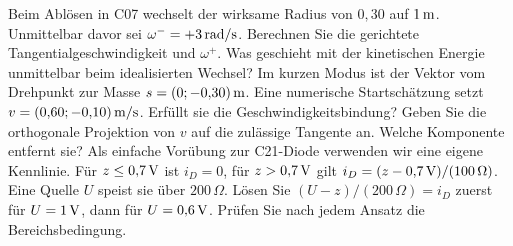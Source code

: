 Beim Ablösen in C07 wechselt der wirksame Radius von \(0{,}30\) auf \(1\,\mathrm{m}\). Unmittelbar davor sei \(\omega^-=+3\,\mathrm{rad/s}\). Berechnen Sie die gerichtete Tangentialgeschwindigkeit und \(\omega^+\). Was geschieht mit der kinetischen Energie unmittelbar beim idealisierten Wechsel?
Im kurzen Modus ist der Vektor vom Drehpunkt zur Masse \(s=(0;-0{,}30)\,\mathrm{m}\). Eine numerische Startschätzung setzt \(v=(0{,}60;-0{,}10)\,\mathrm{m/s}\). Erfüllt sie die Geschwindigkeitsbindung? Geben Sie die orthogonale Projektion von \(v\) auf die zulässige Tangente an. Welche Komponente entfernt sie?
Als einfache Vorübung zur C21-Diode verwenden wir eine eigene Kennlinie. Für \(z\le0{,}7\,\mathrm{V}\) ist \(i_D=0\), für \(z>0{,}7\,\mathrm{V}\) gilt \(i_D=(z-0{,}7\,\mathrm{V})/(100\,\Omega)\). Eine Quelle \(U\) speist sie über \(200\,\Omega\). Lösen Sie \((U-z)/(200\,\Omega)=i_D\) zuerst für \(U=1\,\mathrm{V}\), dann für \(U=0{,}6\,\mathrm{V}\). Prüfen Sie nach jedem Ansatz die Bereichsbedingung.

\schreibfeld



